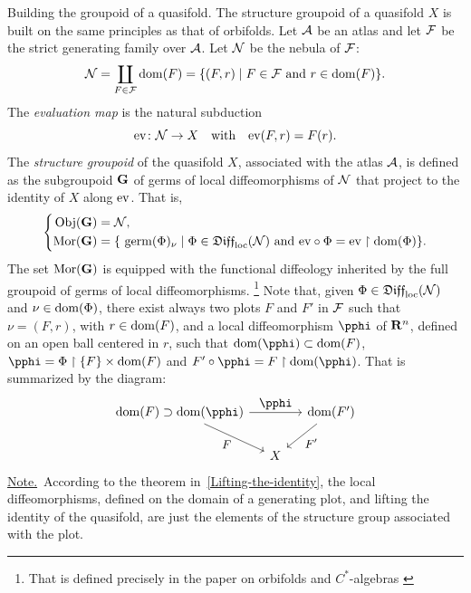 \begin{Article}{Building the groupoid of a quasifold.}{}
  The structure groupoid of a quasifold $X$ is built on the same principles as that of orbifolds.
  Let $\mathcal{A}$ be an atlas and let $\mathcal{F}$ be the strict generating family over $\mathcal{A}$.
  Let $\mathcal{N}$ be the nebula of $\mathcal{F}$:
  \[
    \mathcal{N} = \coprod_{F \in \mathcal{F}} \mathrm{dom}(F) = \{ (F,r) \mid F \in \mathcal{F} \text{ and } r \in \mathrm{dom}(F) \}.
    \]
  The \emph{evaluation map} is the natural subduction
  \[
    {\operatorname{ev}} \colon \mathcal{N} \to X \quad \mbox{with} \quad {\operatorname{ev}}(F,r) = F(r).
    \]
  The \emph{structure groupoid} of the quasifold $X$,
  associated with the atlas $\mathcal{A}$,
  is defined as the subgroupoid ${\mathbf G}$ of germs of local diffeomorphisms of $\mathcal{N}$ that project to the identity of $X$ along ${\operatorname{ev}}$.
  That is,
  \[
    \left\{
    \begin{aligned}
    {\operatorname{Obj}}({\mathbf G}) & =  \mathcal{N}, \\
    {\operatorname{Mor}}({\mathbf G}) & =  \{\ \operatorname{germ}(\Phi)_\nu \mid \Phi \in \mathfrak{Diff}_{\mathrm{loc}}(\mathcal{N}) \mbox{ and } {\operatorname{ev}} \circ \Phi = {\operatorname{ev}} \restriction \mathrm{dom}(\Phi) \}.
    \end{aligned}
    \right.
    \]
  The set ${\operatorname{Mor}}({\mathbf G})$ is equipped with the functional diffeology inherited by the full groupoid of germs of local diffeomorphisms.%
  \footnote{That is defined precisely in the paper on orbifolds and $C^*$-algebras \cite[\textsection\,2 \& 3]{IZL18}}
  Note that,
  given $\Phi \in \mathfrak{Diff}_{\mathrm{loc}}(\mathcal{N})$ and $\nu \in \mathrm{dom}(\Phi)$,
  there exist always two plots $F$ and $F'$ in $\mathcal{F}$ such that $\nu=(F,r)$,
  with $r \in \mathrm{dom}(F)$,
  and a local diffeomorphism $\pphi$ of $\mathbf{R}^n$,
  defined on an open ball centered in $r$,
  such that $\Domain(\pphi) \subset \Domain(F)$,
  $\pphi = \Phi \restriction \{F\}\times \Domain(F)$
  and $F' \circ \pphi = F \restriction \Domain(\pphi)$.
  That is summarized by the diagram:
  \[
    \begin{tikzcd}[column sep=small,every label/.append style = {font = \small}]
    \Domain(F) \supset \Domain(\pphi) \arrow[dr, swap, "F"]  \arrow[rr, "\normalsize \pphi"] &    & \Domain(F')\arrow[dl,"F'"] \\
    & X  &
    \end{tikzcd}
    \]
  \uline{Note.}~According to the theorem in \textsection\,\ref{Lifting-the-identity},
  the local diffeomorphisms,
  defined on the domain of a generating plot,
  and lifting the identity of the quasifold,
  are just the elements of the structure group associated with the plot.
  

\end{Article}
